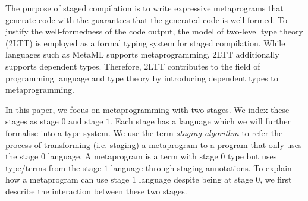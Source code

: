 The purpose of staged compilation is to write expressive metaprograms that generate code with the guarantees that the generated code is well-formed. To justify the well-formedness of the code output, the model of two-level type theory (2LTT) \cite{2ltt} is employed as a formal typing system for staged compilation. While languages such as MetaML \cite{10.1145/258994.259019} supports metaprogramming, 2LTT additionally supports dependent types. 
Therefore, 2LTT contributes to the field of programming language and type theory by introducing dependent types to metaprogramming.



In this paper, we focus on metaprogramming with two stages. We index these stages as stage $0$ and stage $1$. Each stage has a language which we will further formalise into a type system. We use the term \emph{staging algorithm} to refer the process of transforming (i.e. staging) a metaprogram to a program that only uses the stage $0$ language. A metaprogram is a term with stage $0$ type but uses type/terms from the stage $1$ language through staging annotations. To explain how a metaprogram can use stage $1$ language despite being at stage $0$, we first describe the interaction between these two stages.

